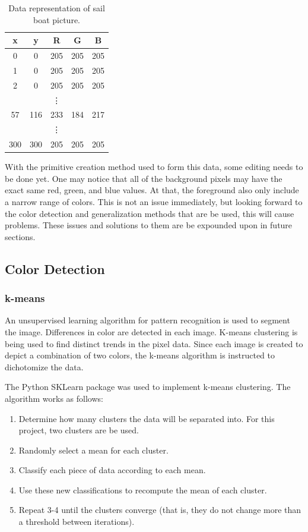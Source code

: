 \documentclass[12pt]{article}
\begin{document}
\begin{multicols}{2}
\begin{table}[H]
	\centering
		\caption{Data representation of sail boat picture.}
		\label{table:1}
	\begin{tabular}{ c c c c c}
		x & y & R & G & B \\\hline 
		0 & 0 & 205 & 205 & 205 \\  
		1 & 0 & 205 & 205 & 205 \\
		2 & 0 & 205 & 205 & 205 \\    
		&  & \vdots &  &  \\ 
		57 & 116 & 233 & 184 &217\\
		&  & \vdots &  &  \\ 
		300 & 300 & 205 & 205 & 205 \\		
	\end{tabular}

\end{table}

With the primitive creation method used to form this data, some editing needs to be done yet. One may notice that all of the background pixels may have the exact same red, green, and blue values. At that, the foreground also only include a narrow range of colors. This is not an issue immediately, but looking forward to the color detection and generalization methods that are be used, this will cause problems. These issues and solutions to them are be expounded upon in future sections.

\subsection{Color Detection}
\subsubsection{k-means}
An unsupervised learning algorithm for pattern recognition is used to segment the image. Differences in color are detected in each image. K-means clustering \cite{kmeans} is being used to find distinct trends in the pixel data. Since each image is created to depict a combination of two colors, the k-means algorithm is instructed to dichotomize the data.

The Python SKLearn package was used to implement k-means clustering. The algorithm works as follows:

\begin{enumerate}
\item Determine how many clusters the data will be separated into. For this project, two clusters are be used.
\item Randomly select a mean for each cluster.
\item Classify each piece of data according to each mean.
\item Use these new classifications to recompute the mean of each cluster.
\item Repeat 3-4 until the clusters converge (that is, they do not change more than a threshold between iterations).
\end{enumerate}


\end{multicols}
\end{document}
